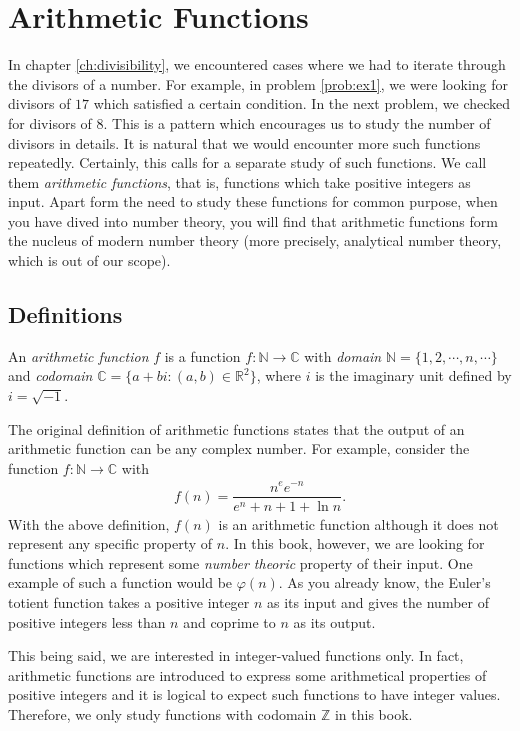 \documentclass[12pt]{subfile}
\begin{document}
\chapter{Arithmetic Functions}\label{ch:arithfunc}

	In chapter \ref{ch:divisibility}, we encountered cases where we had to iterate through the divisors of a number. For example, in problem \ref{prob:ex1}, we were looking for divisors of $17$ which satisfied a certain condition. In the next problem, we checked for divisors of $8$. This is a pattern which encourages us to study the number of divisors in details. It is natural that we would encounter more such functions repeatedly. Certainly, this calls for a separate study of such functions. We call them \textit{arithmetic functions}, that is, functions which take positive integers as input. Apart form the need to study these functions for common purpose, when you have dived into number theory, you will find that arithmetic functions form the nucleus of modern number theory (more precisely, analytical number theory, which is out of our scope)\watermark.
\section{Definitions}

		\begin{definition}
			An \textit{arithmetic function} $f$ is a function $f : \mathbb{N} \to \mathbb{C} $ with \textit{domain} $\mathbb{N} = \{1, 2, \cdots, n, \cdots\}$ and \textit{codomain} $\mathbb{C} = \{a+bi: (a,b)\in \mathbb{R}^2 \}$, where $i$ is the imaginary unit defined by $i=\sqrt{-1}$.
		\end{definition}

		\begin{remark}
			The original definition of arithmetic functions states that the output of an arithmetic function can be any complex number. For example, consider the function $f:\mathbb{N}\to \mathbb{C}$ with
				\begin{align*}
					f(n)=\dfrac{n^ee^{-n}}{e^n+n+1+\ln n}.
				\end{align*}
			With the above definition, $f(n)$ is an arithmetic function although it does not represent any specific property of $n$. In this book, however, we are looking for functions which represent some \textit{number theoric} property of their input. One example of such a function would be $\varphi(n)$. As you already know, the Euler's totient function takes a positive integer $n$ as its input and gives the number of positive integers less than $n$ and coprime to $n$ as its output.

			This being said, we are interested in integer-valued functions only. In fact, arithmetic functions are introduced to express some arithmetical properties of positive integers and it is logical to expect such functions to have integer values. Therefore, we only study functions with codomain $\mathbb Z$ in this book.
		\end{remark}
\end{document}
